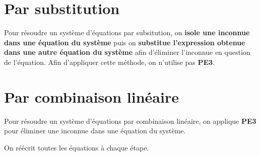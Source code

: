 \documentclass[a4paper,12pt]{report}
\begin{document}
\section*{Par substitution}
Pour résoudre un système d'équations par subsitution, on {\bfseries isole une inconnue dans une équation du système} puis on {\bfseries substitue l'expression obtenue dans une autre équation du système} afin \og{}d'éliminer\fg{} l'inconnue en question de l'équation. 
Afin d'appliquer cette méthode, on n'utilise pas {\bfseries PE3}.
\begin{boiteExT}[$\systeme{-3x+y=9,4x-3y=-17}$]
\vspace{15cm}
\end{boiteExT}
\newpage
\section*{Par combinaison linéaire}
Pour résoudre un système d'équations par combinaison linéaire, on applique {\bfseries PE3} pour éliminer une inconnue dans une équation du système.  
\begin{boiteExT}[$\systeme{5x-4y=8,2x+5y=1}$]
\vspace{15cm}
\end{boiteExT}
\begin{boiteicone}
	On réécrit toutes les équations à chaque étape.
\end{boiteicone}
\end{document}
